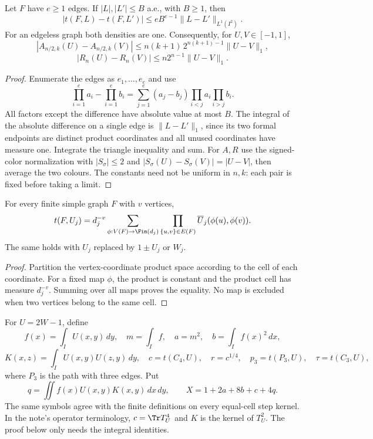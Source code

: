 \begin{lemma}
\label{lem:L1-counting}
\proved Let $F$ have $e\ge1$ edges.  If $|L|,|L'|\le B$ a.e., with $B\ge1$, then
\[
 |t(F,L)-t(F,L')|\le eB^{e-1}\|L-L'\|_{L^1(I^2)}.
\]
For an edgeless graph both densities are one.  Consequently, for $U,V\in[-1,1]$,
\[
 |A_{n/2,k}(U)-A_{n/2,k}(V)|
 \le n(k+1)\,2^{n(k+1)-1}\|U-V\|_1,
\]
\[
 |R_n(U)-R_n(V)|\le n2^{n-1}\|U-V\|_1.
\]
\end{lemma}
\begin{proof}
Enumerate the edges as $e_1,\ldots,e_e$ and use
\[
 \prod_{i=1}^e a_i-\prod_{i=1}^e b_i
 =\sum_{j=1}^e(a_j-b_j)\prod_{i<j}a_i\prod_{i>j}b_i.
\]
All factors except the difference have absolute value at most $B$.  The integral of the
absolute difference on a single edge is $\|L-L'\|_1$, since its two formal endpoints are
distinct product coordinates and all unused coordinates have measure one.  Integrate the
triangle inequality and sum.  For $A,R$ use the signed-color normalization with
$|S_\sigma|\le2$ and $|S_\sigma(U)-S_\sigma(V)|=|U-V|$, then average the two colours.
The constants need not be uniform in $n,k$: each pair is fixed before taking a limit.
\end{proof}

\begin{lemma}
\label{lem:step-matrix}
\proved For every finite simple graph $F$ with $v$ vertices,
\[
 t(F,U_j)=d_j^{-v}\sum_{\phi:V(F)\to\Fin(d_j)}
                       \prod_{\{u,v\}\in E(F)}\overline U_j(\phi(u),\phi(v)).
\]
The same holds with $U_j$ replaced by $1\pm U_j$ or $W_j$.
\end{lemma}
\begin{proof}
Partition the vertex-coordinate product space according to the cell of each coordinate.
For a fixed map $\phi$, the product is constant and the product cell has measure $d_j^{-v}$.
Summing over all maps proves the equality.  No map is excluded when two vertices belong
to the same cell.
\end{proof}

\begin{definition}
\label{def:integral-scalars}
For $U=2W-1$, define
\[
 f(x)=\int_IU(x,y)\,dy,\quad m=\int_If,\quad a=m^2,\quad b=\int_If(x)^2\,dx,
\]
\[
 K(x,z)=\int_IU(x,y)U(z,y)\,dy,\quad
 c=t(C_4,U),\quad r=c^{1/4},\quad p_3=t(P_3,U),\quad\tau=t(C_3,U),
\]
where $P_3$ is the path with three edges.  Put
\[
 q=\iint f(x)U(x,y)K(x,y)\,dx\,dy,
 \qquad X=1+2a+8b+c+4q.
\]
The same symbols agree with the finite definitions on every equal-cell step kernel.
In the note's operator terminology, $c=\Tr T_U^4$ and $K$ is the kernel of $T_U^2$.
The proof below only needs the integral identities.
\end{definition}


